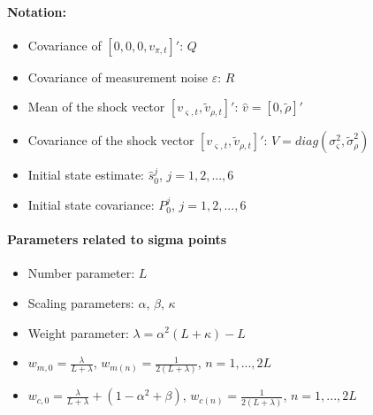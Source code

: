 \documentclass[12pt,letter,leqno]{article}
\theoremstyle{asn}
\theoremstyle{lem}
\theoremstyle{slem}
\theoremstyle{prop}
\theoremstyle{appprop}
\theoremstyle{rem}
\theoremstyle{defn}
\begin{document}
\paragraph{Notation:}
\begin{itemize}
\item Covariance of $[0,0,0,v_{\pi,t}]'$: $Q$
\item Covariance of measurement noise $\varepsilon$: $R$
\item Mean of the shock vector $[v_{\varsigma,t},\tilde{v}_{\rho,t}]'$: $\hat{v}=[0,\tilde{\rho}]'$
\item Covariance of the shock vector $[v_{\varsigma,t},\tilde{v}_{\rho,t}]'$: $V=diag(\sigma_\varsigma^2,\tilde{\sigma}_\rho^2)$
\item Initial state estimate: $\hat{s}_0^j$, $j=1,2,...,6$
\item Initial state covariance: $P_0^j$, $j=1,2,...,6$
\end{itemize}

\paragraph{Parameters related to sigma points}
\begin{itemize}
\item Number parameter: $L$
\item Scaling parameters: $\alpha$, $\beta$, $\kappa$
\item Weight parameter: $\lambda = \alpha^2(L+\kappa)-L$
\item $w_{m,0}=\frac{\lambda}{L+\lambda}$, $w_{m(n)}=\frac{1}{2(L+\lambda)}$, $n=1,...,2L$
\item $w_{c,0}=\frac{\lambda}{L+\lambda}+(1-\alpha^2+\beta)$, $w_{c(n)}=\frac{1}{2(L+\lambda)}$, $n=1,...,2L$
\end{itemize}
\end{document}

